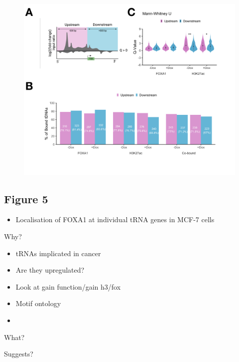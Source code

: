 \documentclass[
  11pt,
]{article}
\providecommand{\tightlist}{%
  \setlength{\itemsep}{0pt}\setlength{\parskip}{0pt}}
\begin{document}
\begin{figure}[H]
\includegraphics[width=1\linewidth]{../images/results-04} \end{figure}

\hypertarget{figure-5}{%
\subsection{Figure 5}\label{figure-5}}

\begin{itemize}
\tightlist
\item
  Localisation of FOXA1 at individual tRNA genes in MCF-7 cells
\end{itemize}

Why?

\begin{itemize}
\item
  tRNAs implicated in cancer
\item
  Are they upregulated?
\item
  Look at gain function/gain h3/fox
\item
  Motif ontology
\item
\end{itemize}

What?

Suggests?
\end{document}
